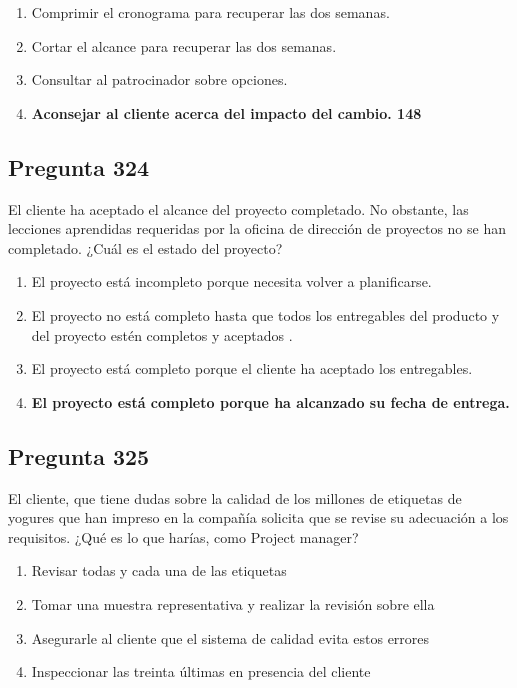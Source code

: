 \documentclass[11pt,a4paper]{article}
\begin{document}
\begin{enumerate}[label=\alph*)]
  \item Comprimir el cronograma para recuperar las dos semanas.
  \item Cortar el alcance para recuperar las dos semanas.
  \item Consultar al patrocinador sobre opciones.
  \item \textbf{Aconsejar al cliente acerca del impacto del cambio. 148}
\end{enumerate}

\subsection*{Pregunta 324}
El cliente ha aceptado el alcance del proyecto completado. No obstante, las lecciones aprendidas requeridas por la oficina de dirección de proyectos no se han completado. ¿Cuál es el estado del proyecto?

\begin{enumerate}[label=\alph*)]
  \item El proyecto está incompleto porque necesita volver a planificarse.
  \item El proyecto no está completo hasta que todos los entregables del producto y del proyecto estén completos y aceptados .
  \item El proyecto está completo porque el cliente ha aceptado los entregables.
  \item \textbf{El proyecto está completo porque ha alcanzado su fecha de entrega.}
\end{enumerate}

\subsection*{Pregunta 325}
El cliente, que tiene dudas sobre la calidad de los millones de etiquetas de yogures que han impreso en la compañía solicita que se revise su adecuación a los requisitos. ¿Qué es lo que harías, como Project manager?

\begin{enumerate}[label=\alph*)]
  \item Revisar todas y cada una de las etiquetas
  \item Tomar una muestra representativa y realizar la revisión sobre ella
  \item Asegurarle al cliente que el sistema de calidad evita estos errores
  \item Inspeccionar las treinta últimas en presencia del cliente
\end{enumerate}
\end{document}
